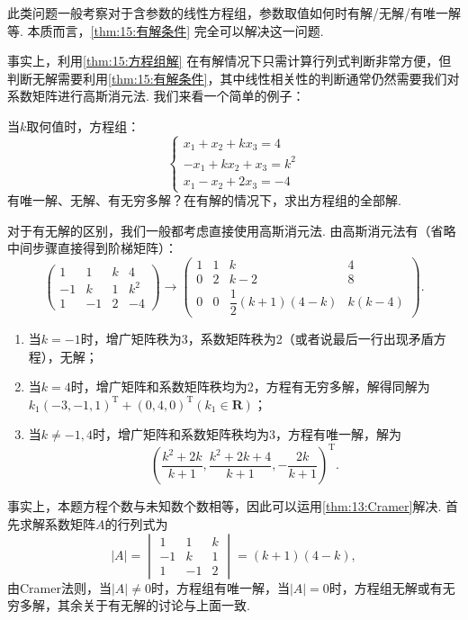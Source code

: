 此类问题一般考察对于含参数的线性方程组，参数取值如何时有解/无解/有唯一解等. 本质而言，\autoref{thm:15:有解条件} 完全可以解决这一问题.

事实上，利用\autoref{thm:15:方程组解} 在有解情况下只需计算行列式判断非常方便，但判断无解需要利用\autoref{thm:15:有解条件}，其中线性相关性的判断通常仍然需要我们对系数矩阵进行高斯消元法. 我们来看一个简单的例子：
\begin{example}
    当$k$取何值时，方程组：
    \[\begin{cases}
            x_1+x_2+kx_3=4 \\ -x_1+kx_2+x_3=k^2 \\ x_1-x_2+2x_3=-4
        \end{cases}\]
    有唯一解、无解、有无穷多解？在有解的情况下，求出方程组的全部解.
\end{example}
\begin{solution}
    对于有无解的区别，我们一般都考虑直接使用高斯消元法. 由高斯消元法有（省略中间步骤直接得到阶梯矩阵）：
    \[\begin{pmatrix}
            1 & 1 & k & 4  \\
            -1 & k & 1 & k^2 \\
            1 & -1 & 2 & -4
        \end{pmatrix}\to\begin{pmatrix}
            1 & 1 & k & 4  \\
            0 & 2 & k-2 & 8 \\
            0 & 0 & \dfrac{1}{2}(k+1)(4-k) & k(k-4)
        \end{pmatrix}.\]
    \begin{enumerate}
        \item 当$k=-1$时，增广矩阵秩为3，系数矩阵秩为2（或者说最后一行出现矛盾方程），无解；
        \item 当$k=4$时，增广矩阵和系数矩阵秩均为2，方程有无穷多解，解得同解为$k_1(-3,-1,1)^{\mathrm{T}}+(0,4,0)^{\mathrm{T}}(k_1\in\mathbf{R})$；
        \item 当$k\neq-1,4$时，增广矩阵和系数矩阵秩均为3，方程有唯一解，解为
        \[(\dfrac{k^2+2k}{k+1},\dfrac{k^2+2k+4}{k+1},-\dfrac{2k}{k+1})^{\mathrm{T}}.\]
    \end{enumerate}

    事实上，本题方程个数与未知数个数相等，因此可以运用\autoref{thm:13:Cramer}解决. 首先求解系数矩阵$A$的行列式为
    \[|A|=\begin{vmatrix}
            1 & 1 & k  \\
            -1 & k & 1  \\
            1 & -1 & 2
        \end{vmatrix}=(k+1)(4-k),\]
    由Cramer法则，当$|A|\neq 0$时，方程组有唯一解，当$|A|=0$时，方程组无解或有无穷多解，其余关于有无解的讨论与上面一致.
\end{solution}

